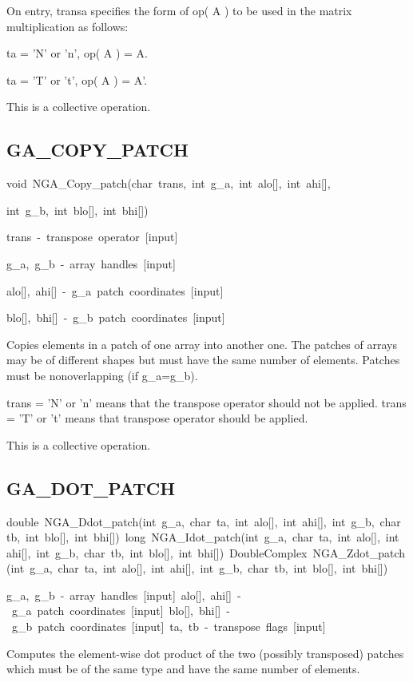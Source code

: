 On entry, transa specifies the form of op( A ) to be used in the matrix
multiplication as follows:

ta = 'N' or 'n', op( A ) = A.

ta = 'T' or 't', op( A ) = A'.

This is a collective operation. 


\subsection*{GA\_COPY\_PATCH}
\begin{lyxcode}
void~NGA\_Copy\_patch(char~trans,~int~g\_a,~int~alo{[}{]},~int~ahi{[}{]},~

int~g\_b,~int~blo{[}{]},~int~bhi{[}{]})~



trans~-~transpose~operator~{[}input{]}

g\_a,~g\_b~-~array~handles~{[}input{]}

alo{[}{]},~ahi{[}{]}~-~g\_a~patch~coordinates~{[}input{]}

blo{[}{]},~bhi{[}{]}~-~g\_b~patch~coordinates~{[}input{]}
\end{lyxcode}
Copies elements in a patch of one array into another one. The patches
of arrays may be of different shapes but must have the same number
of elements. Patches must be nonoverlapping (if g\_a=g\_b).

trans = 'N' or 'n' means that the transpose operator should not be
applied. trans = 'T' or 't' means that transpose operator should be
applied.

This is a collective operation. 


\subsection*{GA\_DOT\_PATCH}
\begin{lyxcode}
double~NGA\_Ddot\_patch(int~g\_a,~char~ta,~int~alo{[}{]},~int~ahi{[}{]},~int~g\_b,~char~tb,~int~blo{[}{]},~int~bhi{[}{]})~long~NGA\_Idot\_patch(int~g\_a,~char~ta,~int~alo{[}{]},~int~ahi{[}{]},~int~g\_b,~char~tb,~int~blo{[}{]},~int~bhi{[}{]})~DoubleComplex~NGA\_Zdot\_patch(int~g\_a,~char~ta,~int~alo{[}{]},~int~ahi{[}{]},~int~g\_b,~char~tb,~int~blo{[}{]},~int~bhi{[}{]})~

g\_a,~g\_b~-~array~handles~{[}input{]}~alo{[}{]},~ahi{[}{]}~-~g\_a~patch~coordinates~{[}input{]}~blo{[}{]},~bhi{[}{]}~-~g\_b~patch~coordinates~{[}input{]}~ta,~tb~-~transpose~flags~{[}input{]}
\end{lyxcode}
Computes the element-wise dot product of the two (possibly transposed)
patches which must be of the same type and have the same number of
elements.

